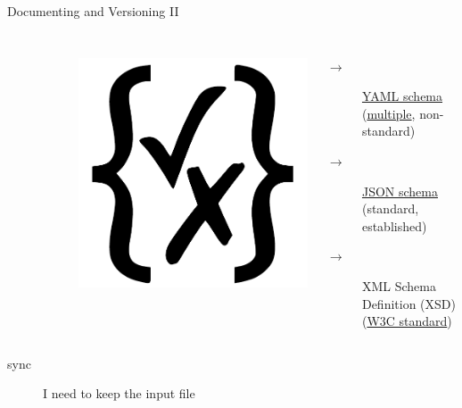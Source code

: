 \documentclass[9pt]{beamer}
\begin{document}
\begin{frame}[fragile]{Documenting and Versioning II}
\begin{columns}
\begin{column}{0.5\textwidth}
\begin{description}
\begin{description}
\begin{columns}
\begin{column}{0.15\textwidth}
                                \includegraphics[width=0.8\hsize]{jsonschema}
                            \end{column}
                            \begin{column}{0.9\textwidth}
                                \begin{description}
                                    \item[$\to$]
                                        \href{https://asdf-standard.readthedocs.io/en/latest/schemas/yaml_schema.html}{YAML
                                        schema}
                                        (\href{https://json-schema-everywhere.github.io/yaml}{multiple},
                                        non-standard)
                                    \item[$\to$] \href{https://json-schema.org/}{JSON schema} (standard, established)
                                    \item[$\to$] XML Schema Definition (XSD)
                                        (\href{https://www.w3.org/TR/xmlschema11-1/}{W3C
                                        standard})
                                \end{description}
                            \end{column}
                        \end{columns}
                        \vspace*{5pt}
                    \end{description}
                \item[sync] I need to keep the input file 

\end{description}
\end{column}
\end{columns}
\end{frame}
\end{document}
